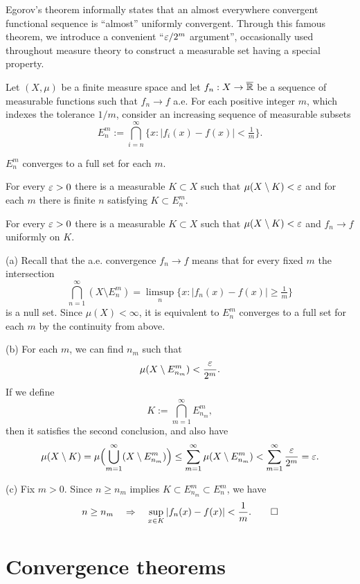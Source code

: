 \documentclass{../../large}
\begin{document}
\begin{prb}
Egorov's theorem informally states that an almost everywhere convergent functional sequence is ``almost'' uniformly convergent.
Through this famous theorem, we introduce a convenient ``$\varepsilon/2^m$ argument'', occasionally used throughout measure theory to construct a measurable set having a special property.

Let $(X,\mu)$ be a finite measure space and let $f_n:X\to\overline{\mathbb{R}}$ be a sequence of measurable functions such that $f_n\to f$ a.e.
For each positive integer $m$, which indexes the tolerance $1/m$, consider an increasing sequence of measurable subsets
\[E_n^m:=\bigcap_{i=n}^\infty\{x:|f_i(x)-f(x)|<\tfrac1m\}.\]
\begin{parts}
\item $E_n^m$ converges to a full set for each $m$.
\item For every $\varepsilon>0$ there is a measurable $K\subset X$ such that $\mu(X\setminus K)<\varepsilon$ and for each $m$ there is finite $n$ satisfying $K\subset E_n^m$.
\item For every $\varepsilon>0$ there is a measurable $K\subset X$ such that $\mu(X\setminus K)<\varepsilon$ and $f_n\to f$ uniformly on $K$.
\end{parts}
\end{prb}
\begin{pf}
(a)
Recall that the a.e. convergence $f_n\to f$ means that for every fixed $m$ the intersection
\[\bigcap_{n=1}^\infty(X\setminus E_n^m)=\limsup_n\{x:|f_n(x)-f(x)|\ge\tfrac1m\}\]
is a null set.
Since $\mu(X)<\infty$, it is equivalent to $E_n^m$ converges to a full set for each $m$ by the continuity from above.

(b)
For each $m$, we can find $n_m$ such that
\[\mu(X\setminus E_{n_m}^m)<\frac{\varepsilon}{2^m}.\]
If we define
\[K:=\bigcap_{m=1}^\infty E_{n_m}^m,\]
then it satisfies the second conclusion, and also have
\[\mu(X\setminus K)=\mu\Bigl(\bigcup_{m=1}^\infty(X\setminus E_{n_m}^m)\Bigr)\le\sum_{m=1}^\infty\mu(X\setminus E_{n_m}^m)<\sum_{m=1}^\infty\frac{\varepsilon}{2^m}=\varepsilon.\]


(c)
Fix $m>0$.
Since $n\ge n_m$ implies $K\subset E_{n_m}^m\subset E_n^m$, we have
\[n\ge n_m\quad\Rightarrow\quad\sup_{x\in K}|f_n(x)-f(x)|<\frac1m.\qedhere\]
\end{pf}







\section{Convergence theorems}
\end{document}
